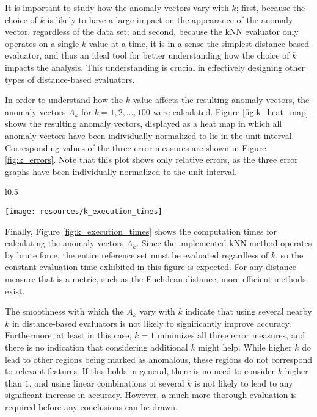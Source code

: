 It is important to study how the anomaly vectors vary with $k$; first, because the choice of $k$ is likely to have a large impact on the appearance of the anomaly vector, regardless of the data set; and second, because the kNN evaluator only operates on a single $k$ value at a time, it is in a sense the simplest distance-based evaluator, and thus an ideal tool for better understanding how the choice of $k$ impacts the analysis. This understanding is crucial in effectively designing other types of distance-based evaluators. 

In order to understand how the $k$ value affects the resulting anomaly vectors, the anomaly vectors $A_{k}$ for $k = 1,2,\dots,100$ were calculated. Figure \ref{fig:k_heat_map} shows the resulting anomaly vectors, displayed as a heat map in which all anomaly vectors have been individually normalized to lie in the unit interval. Corresponding values of the three error measures are shown in Figure \ref{fig:k_errors}. Note that this plot shows only relative errors, as the three error graphs have been individually normalized to the unit interval.

\begin{wrapfigure}{l}{0.5\textwidth}
    \vspace{-20pt}
    \begin{center}
        \texttt{[image: resources/k\_execution\_times]}
    \end{center}
    \vspace{-20pt}
    \caption{\small{Evaluation times when varying $k$ on the standard sequence.}}
    \vspace{-20pt}
    \label{fig:k_execution_times}
\end{wrapfigure}

Finally, Figure \ref{fig:k_execution_times} shows the computation times for calculating the anomaly vectors $A_k$. Since the implemented kNN method operates by brute force, the entire reference set must be evaluated regardless of $k$, so the constant evaluation time exhibited in this figure is expected. For any distance measure that is a metric, such as the Euclidean distance, more efficient methods exist.

The smoothness with which the $A_k$ vary with $k$ indicate that using several nearby $k$ in distance-based evaluators is not likely to significantly improve accuracy. Furthermore, at least in this case, $k=1$ minimizes all three error measures, and there is no indication that considering additional $k$ might help. While higher $k$ do lead to other regions being marked as anomalous, these regions do not correspond to relevant features. If this holds in general, there is no need to consider $k$ higher than $1$, and using linear combinations of several $k$ is not likely to lead to any significant increase in accuracy. However, a much more thorough evaluation is required before any conclusions can be drawn.

